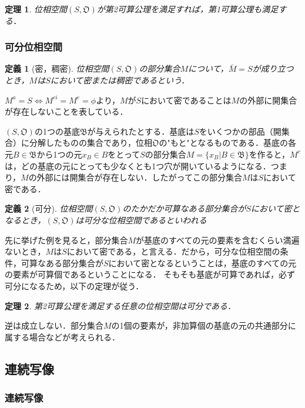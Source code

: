 \documentclass[a4paper,10pt,uplatex]{jsarticle}
\numberwithin{equation}{section}
\theoremstyle{mystyle}
\newtheorem{dfn}{定義}[section]
\newtheorem{thm}{定理}[section]
\newcommand{\gB}{\mathfrak{B}}
\newcommand{\gO}{\mathfrak{O}}
\begin{document}
\begin{thm}
    位相空間$(S,\gO)$が第2可算公理を満足すれば，第1可算公理も満足する．
\end{thm}

\subsubsection{可分位相空間}
\begin{dfn}[密，稠密]
    位相空間$(S,\gO)$の部分集合$M$について，$\bar{M} = S$が成り立つとき，$M$は$S$において密または稠密であるという．
\end{dfn}
$M^a = S \Leftrightarrow M^{ci} = M^e = \phi$より，$M$が$S$において密であることは$M$の外部に開集合が存在しないことを表している．

$(S,\gO)$の1つの基底$\gB$が与えられたとする．基底は$S$をいくつかの部品（開集合）に分解したものの集合であり，位相$\gO$の"もと"となるものである．基底の各元$B \in \gB$から1つの元$x_B \in B$をとって$S$の部分集合$M = \{x_B | B \in \gB\}$を作ると，$M^c$は，どの基底の元にとっても少なくとも1つ穴が開いているようになる．つまり，$M$の外部には開集合が存在しない．したがってこの部分集合$M$は$S$において密である．

\begin{dfn}[可分]
    位相空間$(S,\gO)$のたかだか可算なある部分集合が$S$において密となるとき，$(S,\gO)$は可分な位相空間であるといわれる
\end{dfn}

先に挙げた例を見ると，部分集合$M$が基底のすべての元の要素を含むくらい満遍ないとき，$M$は$S$において密である，と言える．だから，可分な位相空間の条件，可算なある部分集合が$S$において密となるということは，基底のすべての元の要素が可算個であるということになる．
そもそも基底が可算であれば，必ず可分になるため，以下の定理が従う．

\begin{thm}
    第2可算公理を満足する任意の位相空間は可分である．
\end{thm}

逆は成立しない．部分集合$M$の1個の要素が，非加算個の基底の元の共通部分に属する場合などが考えられる．

\subsection{連続写像}
\subsubsection{連続写像}
\end{document}

